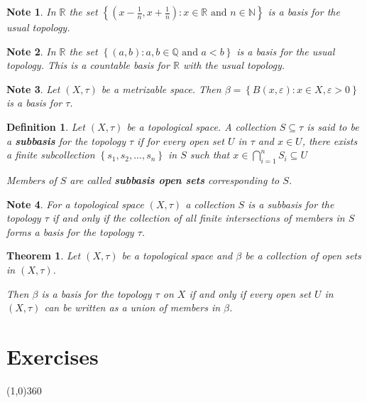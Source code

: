 \documentclass[12pt,twoside]{report}
\newtheorem{defn}{Definition}
\newtheorem{note}{Note}
\newtheorem{thm}{Theorem}
\begin{document}
\begin{note}
    In $\mathbb{R}$ the set $\left\{ \left (x - \frac{1}{n}, x + \frac{1}{n}\right )  :  x \in \mathbb{R}\text{ and }n \in \mathbb{N} \right\}$ is a basis for the usual topology.
\end{note}

\begin{note}
    In $\mathbb{R}$ the set $\left\{ \left (a, b\right )  :  a,b \in \mathbb{Q}\text{ and }a < b \right\}$ is a basis for the usual topology. This is a countable basis for $\mathbb{R}$ with the usual topology.
\end{note}

\begin{note}
    Let $\left (X, \tau\right )$ be a metrizable space. Then $\beta = \left\{ B\left (x, \varepsilon\right )  :  x \in X, \varepsilon >0 \right\}$ is a basis for $\tau$.
\end{note}

\begin{defn}
    Let $\left (X, \tau\right )$ be a topological space. A collection $S \subseteq \tau$ is said to be a \textbf{subbasis} for the topology $\tau$ if for every open set $U$ in $\tau$ and $x \in U$, there exists a finite subcollection $\left\{ s_1, s_2, ..., s_n \right\}$ in $S$ such that $x \in \displaystyle\bigcap_{i = 1}^n S_i \subseteq U$

    Members of $S$ are called \textbf{subbasis open sets} corresponding to $S$.
\end{defn}

\begin{note}
    For a topological space $\left (X, \tau\right )$ a collection $S$ is a subbasis for the topology $\tau$ if and only if the collection of all finite intersections of members in $S$ forms a basis for the topology $\tau$.
\end{note}

\begin{thm}
    Let $\left (X, \tau\right )$ be a topological space and $\beta$ be a collection of open sets in $\left (X, \tau\right )$.

    Then $\beta$ is a basis for the topology $\tau$ on $X$ if and only if every open set $U$ in $\left (X, \tau\right )$ can be written as a union of members in $\beta$.
\end{thm}

\chapter{Exercises}
\line(1,0){360}
\end{document}
